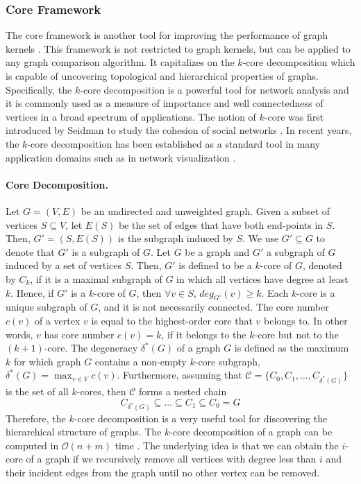 \documentclass[twoside,11pt]{article}
\begin{document}
\subsubsection{Core Framework}
The core framework is another tool for improving the performance of graph kernels .
This framework is not restricted to graph kernels, but can be applied to any graph comparison algorithm.
It capitalizes on the $k$-core decomposition which is capable of uncovering topological and hierarchical properties of graphs.
Specifically, the $k$-core decomposition is a powerful tool for network analysis and it is commonly used as a measure of importance and well connectedness of vertices in a broad spectrum of applications.
The notion of $k$-core was first introduced by Seidman to study the cohesion of social networks .
In recent years, the $k$-core decomposition has been established as a standard tool in many application domains such as in network visualization .

\paragraph{Core Decomposition.}
Let $G = (V,E)$ be an undirected and unweighted graph.
Given a subset of vertices $S \subseteq V$, let $E(S)$ be the set of edges that have both end-points in $S$.
Then, $G'=(S,E(S))$ is the subgraph induced by $S$.
We use $G' \subseteq G$ to denote that $G'$ is a subgraph of $G$.
Let $G$ be a graph and $G'$ a subgraph of $G$ induced by a set of vertices $S$.
Then, $G'$ is defined to be a $k$-core of $G$, denoted by $C_k$, if it is a maximal subgraph of $G$ in which all vertices have degree at least $k$.
Hence, if $G'$ is a $k$-core of $G$, then $\forall v \in S$, $deg_{G'}(v) \geq k$.
Each $k$-core is a unique subgraph of $G$, and it is not necessarily connected.
The core number $c(v)$ of a vertex $v$ is equal to the highest-order core that $v$ belongs to.
In other words, $v$ has core number $c(v) = k$, if it belongs to the $k$-core but not to the $(k+1)$-core.
The degeneracy $\delta^*(G)$ of a graph $G$ is defined as the maximum $k$ for which graph $G$ contains a non-empty $k$-core subgraph, $\delta^*(G) = \max_{v \in V}c(v)$.
Furthermore, assuming that $\mathcal{C} = \{  C_0, C_1, \ldots, C_{\delta^*(G)} \}$ is the set of all $k$-cores, then $\mathcal{C}$ forms a nested chain
\begin{equation}
    C_{\delta^*(G)} \subseteq \ldots \subseteq C_1 \subseteq C_0 = G
\end{equation}
Therefore, the $k$-core decomposition is a very useful tool for discovering the hierarchical structure of graphs.
The $k$-core decomposition of a graph can be computed in $\mathcal{O}(n+m)$ time . 
The underlying idea is that we can obtain the $i$-core of a graph if we recursively remove all vertices with degree less than $i$ and their incident edges from the graph until no other vertex can be removed.
\end{document}
